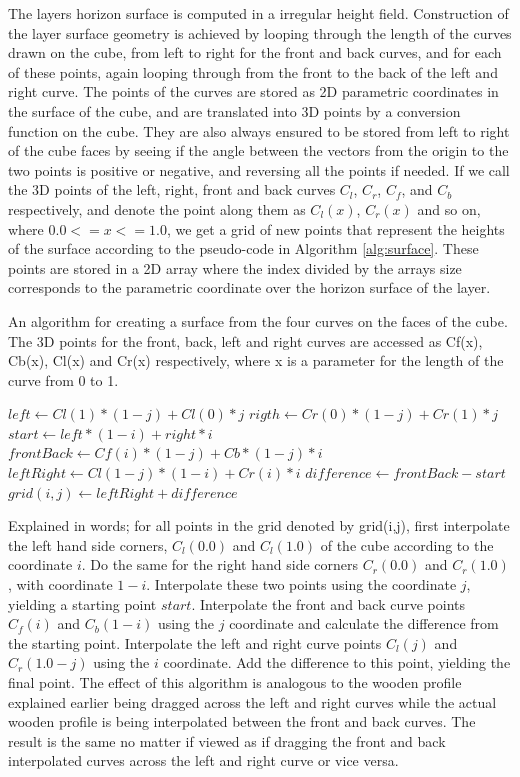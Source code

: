 \documentclass[a4paper,12pt]{report}
\begin{document}
The layers horizon surface is computed in a irregular height field. Construction of the layer surface geometry is achieved by looping through the length of the curves drawn on the cube, from left to right for the front and back curves, and for each of these points, again looping through from the front to the back of the left and right curve. The points of the curves are stored as 2D parametric coordinates in the surface of the cube, and are translated into 3D points by a conversion function on the cube. They are also always ensured to be stored from left to right of the cube faces by seeing if the angle between the vectors from the origin to the two points is positive or negative, and reversing all the points if needed. If we call the 3D points of the left, right, front and back curves $C_l$, $C_r$, $C_f$, and $C_b$ respectively, and denote the point along them as $C_l(x)$, $C_r(x)$ and so on, where $0.0 <= x <= 1.0$, we get a grid of new points that represent the heights of the surface according to the 
pseudo-code in Algorithm \ref{alg:surface}. These points are stored in a 2D array where the index divided by the arrays size corresponds to the parametric coordinate over the horizon surface of the layer.

\begin{algorithm}
\caption{An algorithm for creating a surface from the four curves on the faces of the cube. The 3D points for the front,
back, left and right curves are accessed as Cf(x), Cb(x), Cl(x) and Cr(x) respectively, where x is a parameter for the length of the curve from 0 to 1.}
\label{alg:surface}
\begin{algorithmic}
  \State $left \gets Cl(1)*(1-j) + Cl(0)*j$
  \State $rigth \gets Cr(0)*(1-j) + Cr(1)*j$
  \State $start \gets left*(1-i) + right*i$
  \State $frontBack \gets Cf(i)*(1-j) + Cb*(1-j)*i$
  \State $leftRight \gets Cl(1-j)*(1-i) + Cr(i)*i$
  \State $difference \gets frontBack - start$
  \State $grid(i,j) \gets leftRight + difference$
\EndFor
\end{algorithmic}
\end{algorithm}

Explained in words; for all points in the grid denoted by grid(i,j), first interpolate the left hand side corners, $C_l(0.0)$ and $C_l(1.0)$ of the cube according to the coordinate $i$. Do the same for the right hand side corners $C_r(0.0)$ and $C_r(1.0)$, with coordinate $1-i$. Interpolate these two points using the coordinate $j$, yielding a starting point $start$. Interpolate the front and back curve points $C_f(i)$ and $C_b(1-i)$ using the $j$ coordinate and calculate the difference from the starting point. Interpolate the left and right curve points $C_l(j)$ and $C_r(1.0-j)$ using the $i$ coordinate. Add the difference to this point, yielding the final point. The effect of this algorithm is analogous to the wooden profile explained earlier being dragged across the left and right curves while the actual wooden profile is being interpolated between the front and back curves. The result is the same no matter if viewed as if dragging the front and back interpolated curves across the left and right curve or 
vice versa.
\end{document}
